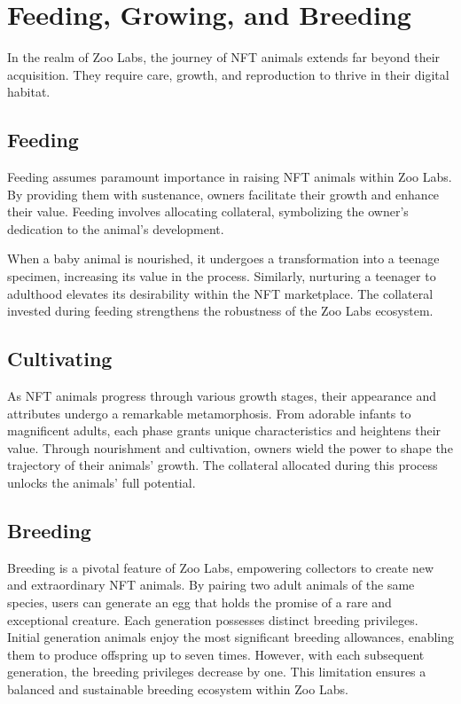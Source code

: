 \section{Feeding, Growing, and Breeding}

In the realm of Zoo Labs, the journey of NFT animals extends far beyond their acquisition. They require care, growth, and reproduction to thrive in their digital habitat.

\subsection{Feeding}

Feeding assumes paramount importance in raising NFT animals within Zoo Labs. By providing them with sustenance, owners facilitate their growth and enhance their value. Feeding involves allocating collateral, symbolizing the owner's dedication to the animal's development.

When a baby animal is nourished, it undergoes a transformation into a teenage specimen, increasing its value in the process. Similarly, nurturing a teenager to adulthood elevates its desirability within the NFT marketplace. The collateral invested during feeding strengthens the robustness of the Zoo Labs ecosystem.

\subsection{Cultivating}

As NFT animals progress through various growth stages, their appearance and attributes undergo a remarkable metamorphosis. From adorable infants to magnificent adults, each phase grants unique characteristics and heightens their value. Through nourishment and cultivation, owners wield the power to shape the trajectory of their animals' growth. The collateral allocated during this process unlocks the animals' full potential.

\subsection{Breeding}

Breeding is a pivotal feature of Zoo Labs, empowering collectors to create new and extraordinary NFT animals. By pairing two adult animals of the same species, users can generate an egg that holds the promise of a rare and exceptional creature. Each generation possesses distinct breeding privileges. Initial generation animals enjoy the most significant breeding allowances, enabling them to produce offspring up to seven times. However, with each subsequent generation, the breeding privileges decrease by one. This limitation ensures a balanced and sustainable breeding ecosystem within Zoo Labs.


